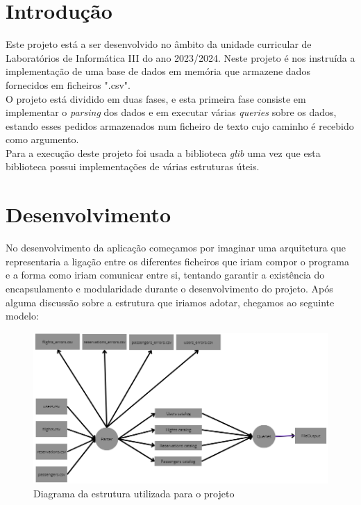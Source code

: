 \documentclass[12pt,a4paper]{report}
\begin{document}
    \chapter{Introdução}
    Este projeto está a ser desenvolvido no âmbito da unidade curricular de Laboratórios de Informática III do ano 2023/2024. Neste projeto é nos instruída a implementação de uma base de dados em memória que armazene dados fornecidos em ficheiros ".csv". \\
    O projeto está dividido em duas fases, e esta primeira fase consiste em implementar o \textit{parsing} dos dados e em executar várias \textit{queries} sobre os dados, estando esses pedidos armazenados num ficheiro de texto cujo caminho é recebido como argumento. \\
      Para a execução deste projeto foi usada a biblioteca \textit{glib} uma vez que esta biblioteca possui implementações de várias estruturas úteis. 
 
\newpage
	
    \chapter{Desenvolvimento}


    No desenvolvimento da aplicação começamos por imaginar uma arquitetura que representaria a ligação entre os diferentes ficheiros que iriam compor o programa e a forma como iriam comunicar entre si, tentando garantir a existência  do encapsulamento e modularidade durante o desenvolvimento do projeto. Após alguma discussão sobre a estrutura que iriamos adotar, chegamos ao seguinte modelo: 
    
    \begin{figure}[h]
    \includegraphics[scale = 0.5]{diagrama.png}
    \centering
    \caption{Diagrama da estrutura utilizada para o projeto}
    \end{figure} 
\end{document}
